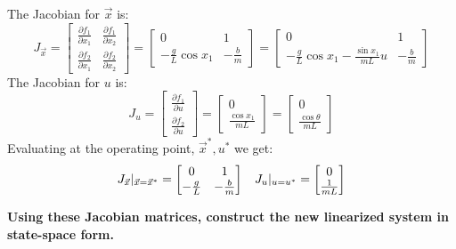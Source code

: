 \begin{enumerate}
{    The Jacobian for $\vec{x}$ is:
    $$J_{\vec{x}} =
    \begin{bmatrix} \frac{\partial f_{1}}{\partial x_{1}} & \frac{\partial f_{1}}{\partial x_{2}} \\
    \frac{\partial f_{2}}{\partial x_{1}} & \frac{\partial f_{2}}{\partial x_{2}}
    \end{bmatrix} = 
    \begin{bmatrix} 0 & 1 \\
    -\frac{g}{L} \cos x_{1} & -\frac{b}{m} 
    \end{bmatrix} = 
    \begin{bmatrix} 0 & 1 \\
    -\frac{g}{L} \cos x_1 - \frac{\sin{x_1}}{mL} u & -\frac{b}{m} 
    \end{bmatrix}
    $$
    The Jacobian for $u$ is:
    $$J_{u} =
    \begin{bmatrix} \frac{\partial f_{1}}{\partial u} \\ \frac{\partial f_{2}}{\partial u} \end{bmatrix} =
    \begin{bmatrix} 0 \\ \frac{\cos x_{1}}{mL} \end{bmatrix} = 
    \begin{bmatrix} 0 \\ \frac{\cos \theta}{mL} \end{bmatrix}
    $$
    Evaluating at the operating point, $\vec{x}^{*}, u^{*}$ we get:
    $$J_{\vec{x}} |_{\vec{x} = \vec{x}^{*}} =
    \begin{bmatrix} 0 & 1 \\
    -\frac{g}{L} & -\frac{b}{m} 
    \end{bmatrix} \hspace{0.3 cm}
    J_{u} |_{u = u^{*}} =
    \begin{bmatrix} 0 \\ \frac{1}{mL} \end{bmatrix}
    $$
  }

  \qitem \textbf{Using these Jacobian matrices, construct the new linearized system in state-space form.}
  \ws {
    \vspace{125px}
  }


\end{enumerate}
